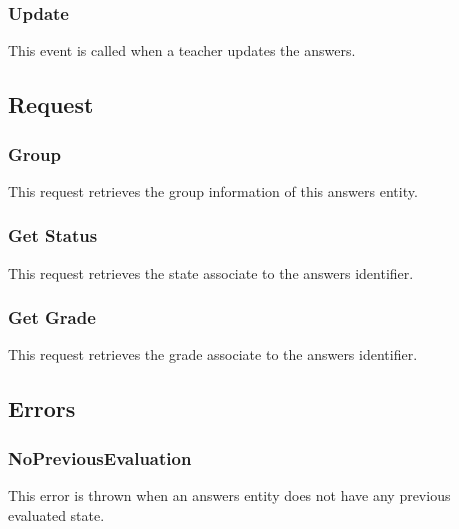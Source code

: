 		\subsubsection{Update}
			This event is called when a teacher updates the answers.
	\subsection{Request}
		\subsubsection{Group}
			This request retrieves the group information of this answers entity.
		\subsubsection{Get Status}
			This request retrieves the state associate to the answers identifier.
		\subsubsection{Get Grade}
			This request retrieves the grade associate to the answers identifier.
	\subsection{Errors}
		\subsubsection{NoPreviousEvaluation}	
			This error is thrown when an answers entity does not have any previous evaluated state.
\newpage

